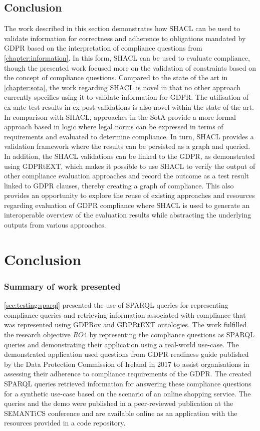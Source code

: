 \subsection*{Conclusion}
The work described in this section demonstrates how SHACL can be used to validate information for correctness and adherence to obligations mandated by GDPR based on the interpretation of compliance questions from \autoref{chapter:information}. In this form, SHACL can be used to evaluate compliance, though the presented work focused more on the validation of constraints based on the concept of compliance questions.
Compared to the state of the art in \autoref{chapter:sota}, the work regarding SHACL is novel in that no other approach currently specifies using it to validate information for GDPR.
The utilisation of ex-ante test results in ex-post validations is also novel within the state of the art.
In comparison with SHACL, approaches in the SotA provide a more formal approach based in logic where legal norms can be expressed in terms of requirements and evaluated to determine compliance.
In turn, SHACL provides a validation framework where the results can be persisted as a graph and queried. In addition, the SHACL validations can be linked to the GDPR, as demonstrated using GDPRtEXT, which makes it possible to use SHACL to verify the output of other compliance evaluation approaches and record the outcome as a test result linked to GDPR clauses, thereby creating a graph of compliance.
This also provides an opportunity to explore the reuse of existing approaches and resources regarding evaluation of GDPR compliance where SHACL is used to generate an interoperable overview of the evaluation results while abstracting the underlying outputs from various approaches.

\section{Conclusion}\label{sec:testing:conclusion}

\subsubsection*{Summary of work presented}
\autoref{sec:testing:sparql} presented the use of SPARQL queries for representing compliance queries and retrieving information associated with compliance that was represented using GDPRov and GDPRtEXT ontologies.
The work fulfilled the research objective $RO4$ by representing the compliance questions as SPARQL queries and demonstrating their application using a real-world use-case.
The demonstrated application used questions from GDPR readiness guide published by the Data Protection Commission of Ireland in 2017 to assist organisations in assessing their adherence to compliance requirements of the GDPR.
The created SPARQL queries retrieved information for answering these compliance questions for a synthetic use-case based on the scenario of an online shopping service.
The queries and the demo were published in a peer-reviewed publication \cite{pandit_queryable_2018} at the SEMANTiCS conference and are available online as an application with the resources provided in a code repository.

